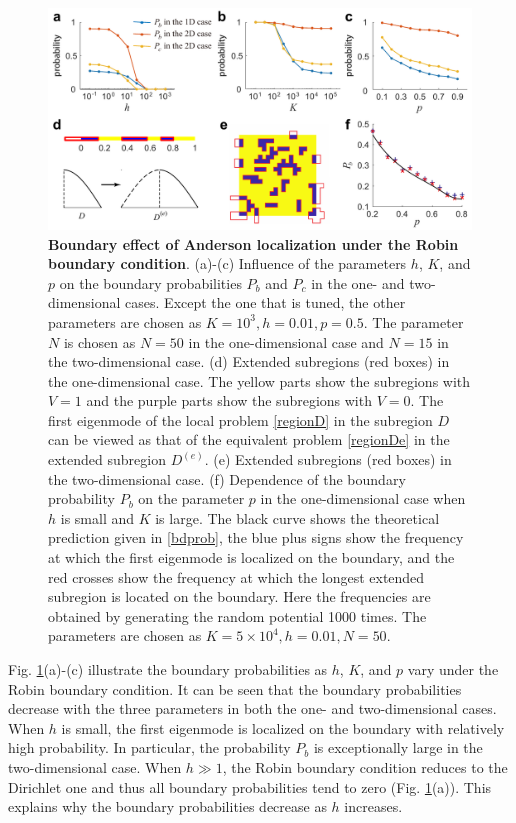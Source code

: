 \documentclass[a4paper,11pt]{article}
\begin{document}
\begin{figure}[!htb]
\centering\includegraphics[width=\linewidth]{Fig3}
\caption{\textbf{Boundary effect of Anderson localization under the Robin boundary condition}. (a)-(c) Influence of the parameters $h$, $K$, and $p$ on the boundary probabilities $P_b$ and $P_c$ in the one- and two-dimensional cases. Except the one that is tuned, the other parameters are chosen as $K = 10^3, h = 0.01, p = 0.5$. The parameter $N$ is chosen as $N = 50$ in the one-dimensional case and $N = 15$ in the two-dimensional case. (d) Extended subregions (red boxes) in the one-dimensional case. The yellow parts show the subregions with $V = 1$ and the purple parts show the subregions with $V = 0$. The first eigenmode of the local problem \eqref{regionD} in the subregion $D$ can be viewed as that of the equivalent problem \eqref{regionDe} in the extended subregion $D^{(e)}$. (e) Extended subregions (red boxes) in the two-dimensional case. (f) Dependence of the boundary probability $P_b$ on the parameter $p$ in the one-dimensional case when $h$ is small and $K$ is large. The black curve shows the theoretical prediction given in \eqref{bdprob}, the blue plus signs show the frequency at which the first eigenmode is localized on the boundary, and the red crosses show the frequency at which the longest extended subregion is located on the boundary. Here the frequencies are obtained by generating the random potential 1000 times. The parameters are chosen as $K = 5 \times 10^4, h = 0.01, N = 50$.}
\label{fig3}
\end{figure}

Fig. \ref{fig3}(a)-(c) illustrate the boundary probabilities as $h$, $K$, and $p$ vary under the Robin boundary condition. It can be seen that the boundary probabilities decrease with the three parameters in both the one- and two-dimensional cases. When $h$ is small, the first eigenmode is localized on the boundary with relatively high probability. In particular, the probability $P_b$ is exceptionally large in the two-dimensional case. When $h\gg 1$, the Robin boundary condition reduces to the Dirichlet one and thus all boundary probabilities tend to zero (Fig. \ref{fig3}(a)). This explains why the boundary probabilities decrease as $h$ increases.
\end{document}
